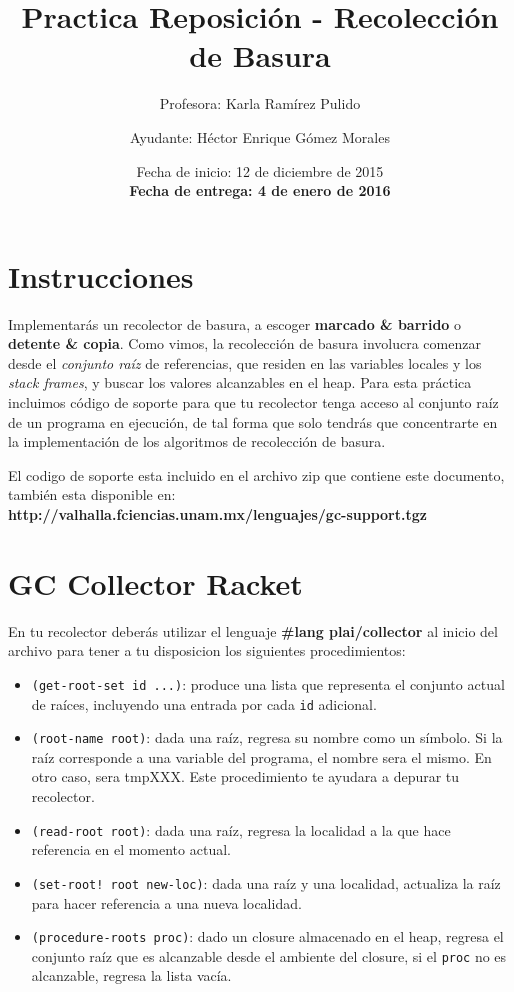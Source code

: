 \documentclass{article}
\author{Profesora: Karla Ramírez Pulido \and
  Ayudante: Héctor Enrique Gómez Morales}
\title{Practica Reposición - Recolección de Basura}
\date{Fecha de inicio: 12 de diciembre de 2015\\
  \textbf{Fecha de entrega: 4 de enero de 2016}}
\begin{document}
\maketitle
\section{Instrucciones}
Implementarás un recolector de basura, a escoger \textbf{marcado \& barrido} o \textbf{detente \& copia}.
Como vimos, la recolección de basura involucra comenzar desde el \textit{conjunto raíz} de referencias,
que residen en las variables locales y los \textit{stack frames}, y buscar los valores alcanzables en el heap.
Para esta práctica incluimos código de soporte para que tu recolector tenga acceso al conjunto raíz de un
programa en ejecución, de tal forma que solo tendrás que concentrarte en la implementación de los algoritmos de
recolección de basura.

El codigo de soporte esta incluido en el archivo zip que contiene este documento, también esta disponible
en: \textbf{http://valhalla.fciencias.unam.mx/lenguajes/gc-support.tgz}

\section*{GC Collector Racket}
En tu recolector deberás utilizar el lenguaje \textbf{\#lang plai/collector} al inicio del archivo
para tener a tu disposicion los siguientes procedimientos:

\begin{itemize}
\item \verb;(get-root-set id ...);: produce una lista que representa el conjunto actual de raíces, incluyendo
  una entrada por cada \verb;id; adicional.
\item \verb;(root-name root);: dada una raíz, regresa su nombre como un símbolo. Si la raíz corresponde a una
  variable del programa, el nombre sera el mismo. En otro caso, sera tmpXXX. Este procedimiento te ayudara a
  depurar tu recolector.
\item \verb;(read-root root);: dada una raíz, regresa la localidad a la que hace referencia en el momento
  actual.
\item \verb;(set-root! root new-loc);: dada una raíz y una localidad, actualiza la raíz para hacer referencia
  a una nueva localidad.
\item \verb;(procedure-roots proc);: dado un closure almacenado en el heap, regresa el conjunto raíz que es
  alcanzable desde el ambiente del closure, si el \verb;proc; no es alcanzable, regresa la lista vacía.
\end{itemize}
\end{document}
